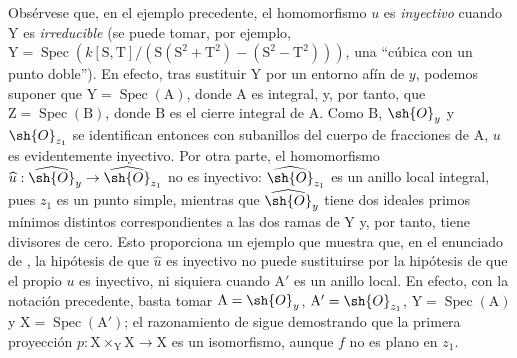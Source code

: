 \begin{env}[11.7.4]
\label{IV.11.7.4}
Obsérvese que, en el ejemplo precedente, el homomorfismo $u$ es \emph{inyectivo} cuando $\mathrm{Y}$ es \emph{irreducible} (se puede tomar, por ejemplo, $\mathrm{Y}=\operatorname{Spec}(k[\mathrm{S},\mathrm{T}]/(\mathrm{S}(\mathrm{S}^2+\mathrm{T}^2)-(\mathrm{S}^2-\mathrm{T}^2)))$, una ``cúbica con un punto doble''). En efecto, tras sustituir $\mathrm{Y}$ por un entorno afín de $y$, podemos suponer que $\mathrm{Y}=\operatorname{Spec}(\mathrm{A})$, donde $\mathrm{A}$ es integral, y, por tanto, que $\mathrm{Z}=\operatorname{Spec}(\mathrm{B})$, donde $\mathrm{B}$ es el cierre integral de $\mathrm{A}$. Como $\mathrm{B}$, $\sh{O}_y$ y $\sh{O}_{z_1}$ se identifican entonces con subanillos del
cuerpo de fracciones de $\mathrm{A}$, $u$ es evidentemente inyectivo.
Por otra parte, el homomorfismo $\widehat{u}:\widehat{\sh{O}}_y\to\widehat{\sh{O}}_{z_1}$ no es inyectivo: $\widehat{\sh{O}}_{z_1}$ es un anillo local integral, pues $z_1$ es un punto simple, mientras que $\widehat{\sh{O}}_y$ tiene dos ideales primos mínimos distintos correspondientes a las dos ramas de $\mathrm{Y}$ y, por tanto, tiene divisores de cero.
Esto proporciona un ejemplo que muestra que, en el enunciado de , la hipótesis de que $\widehat{u}$ es inyectivo no puede sustituirse por la hipótesis de que el propio $u$ es inyectivo, ni siquiera cuando $\mathrm{A}'$ es un anillo local.
En efecto, con la notación precedente, basta tomar $\mathrm{A}=\sh{O}_y$, $\mathrm{A}'=\sh{O}_{z_1}$, $\mathrm{Y}=\operatorname{Spec}(\mathrm{A})$ y $\mathrm{X}=\operatorname{Spec}(\mathrm{A}')$; el razonamiento de  sigue demostrando que la primera proyección $p:\mathrm{X}\times_\mathrm{Y}\mathrm{X}\to\mathrm{X}$ es un isomorfismo, aunque $f$ no es plano en $z_1$.
\end{env}

